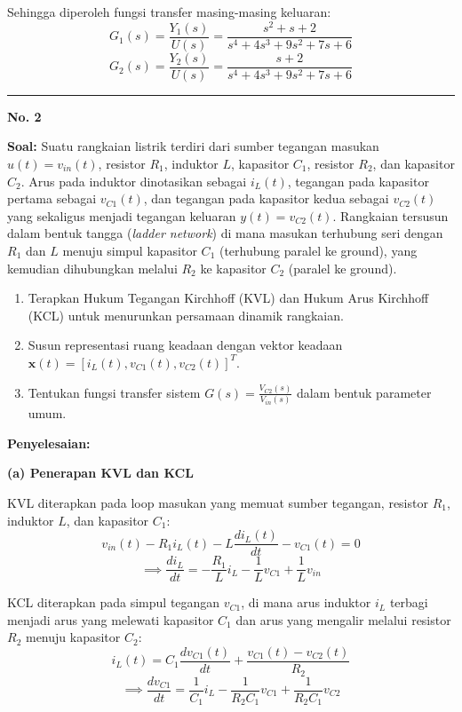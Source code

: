 \documentclass[11pt,a4paper]{article}
\begin{document}
Sehingga diperoleh fungsi transfer masing-masing keluaran:
$$G_1(s) = \frac{Y_1(s)}{U(s)} = \frac{s^2 + s + 2}{s^4 + 4s^3 + 9s^2 + 7s + 6}$$
$$G_2(s) = \frac{Y_2(s)}{U(s)} = \frac{s + 2}{s^4 + 4s^3 + 9s^2 + 7s + 6}$$

\vspace{12pt}
\hrule
\vspace{10pt}

\textbf{\large No. 2}

\textbf{Soal:}  
Suatu rangkaian listrik terdiri dari sumber tegangan masukan $u(t) = v_{in}(t)$, resistor $R_1$, induktor $L$, kapasitor $C_1$, resistor $R_2$, dan kapasitor $C_2$. Arus pada induktor dinotasikan sebagai $i_L(t)$, tegangan pada kapasitor pertama sebagai $v_{C1}(t)$, dan tegangan pada kapasitor kedua sebagai $v_{C2}(t)$ yang sekaligus menjadi tegangan keluaran $y(t) = v_{C2}(t)$. Rangkaian tersusun dalam bentuk tangga (\textit{ladder network}) di mana masukan terhubung seri dengan $R_1$ dan $L$ menuju simpul kapasitor $C_1$ (terhubung paralel ke ground), yang kemudian dihubungkan melalui $R_2$ ke kapasitor $C_2$ (paralel ke ground).
\begin{enumerate}[label=(\alph*)]
    \item Terapkan Hukum Tegangan Kirchhoff (KVL) dan Hukum Arus Kirchhoff (KCL) untuk menurunkan persamaan dinamik rangkaian.
    \item Susun representasi ruang keadaan dengan vektor keadaan $\mathbf{x}(t) = [i_L(t), v_{C1}(t), v_{C2}(t)]^T$.
    \item Tentukan fungsi transfer sistem $G(s) = \frac{V_{C2}(s)}{V_{in}(s)}$ dalam bentuk parameter umum.
\end{enumerate}

\textbf{Penyelesaian:}

\textbf{(a) Penerapan KVL dan KCL}

KVL diterapkan pada loop masukan yang memuat sumber tegangan, resistor $R_1$, induktor $L$, dan kapasitor $C_1$:
$$v_{in}(t) - R_1 i_L(t) - L \frac{di_L(t)}{dt} - v_{C1}(t) = 0$$
$$\implies \frac{di_L}{dt} = -\frac{R_1}{L} i_L - \frac{1}{L} v_{C1} + \frac{1}{L} v_{in}$$

KCL diterapkan pada simpul tegangan $v_{C1}$, di mana arus induktor $i_L$ terbagi menjadi arus yang melewati kapasitor $C_1$ dan arus yang mengalir melalui resistor $R_2$ menuju kapasitor $C_2$:
$$i_L(t) = C_1 \frac{dv_{C1}(t)}{dt} + \frac{v_{C1}(t) - v_{C2}(t)}{R_2}$$
$$\implies \frac{dv_{C1}}{dt} = \frac{1}{C_1} i_L - \frac{1}{R_2 C_1} v_{C1} + \frac{1}{R_2 C_1} v_{C2}$$
\end{document}
